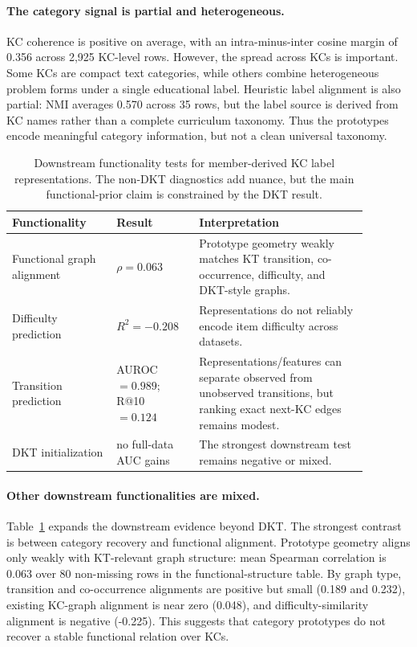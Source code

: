 \paragraph{The category signal is partial and heterogeneous.}
KC coherence is positive on average, with an intra-minus-inter cosine margin of 0.356 across 2,925 KC-level rows. However, the spread across KCs is important. Some KCs are compact text categories, while others combine heterogeneous problem forms under a single educational label. Heuristic label alignment is also partial: NMI averages 0.570 across 35 rows, but the label source is derived from KC names rather than a complete curriculum taxonomy. Thus the prototypes encode meaningful category information, but not a clean universal taxonomy.

\begin{table}[t]
\centering
\small
\begin{tabular}{p{0.26\linewidth}p{0.20\linewidth}p{0.42\linewidth}}
\toprule
Functionality & Result & Interpretation \\
\midrule
Functional graph alignment & $\rho=0.063$ & Prototype geometry weakly matches KT transition, co-occurrence, difficulty, and DKT-style graphs. \\
Difficulty prediction & $R^2=-0.208$ & Representations do not reliably encode item difficulty across datasets. \\
Transition prediction & AUROC $=0.989$; R@10 $=0.124$ & Representations/features can separate observed from unobserved transitions, but ranking exact next-KC edges remains modest. \\
DKT initialization & no full-data AUC gains & The strongest downstream test remains negative or mixed. \\
\bottomrule
\end{tabular}
\caption{Downstream functionality tests for member-derived KC label representations. The non-DKT diagnostics add nuance, but the main functional-prior claim is constrained by the DKT result.}
\label{tab:functionalities}
\end{table}

\paragraph{Other downstream functionalities are mixed.}
Table~\ref{tab:functionalities} expands the downstream evidence beyond DKT. The strongest contrast is between category recovery and functional alignment. Prototype geometry aligns only weakly with KT-relevant graph structure: mean Spearman correlation is 0.063 over 80 non-missing rows in the functional-structure table. By graph type, transition and co-occurrence alignments are positive but small (0.189 and 0.232), existing KC-graph alignment is near zero (0.048), and difficulty-similarity alignment is negative (-0.225). This suggests that category prototypes do not recover a stable functional relation over KCs.

